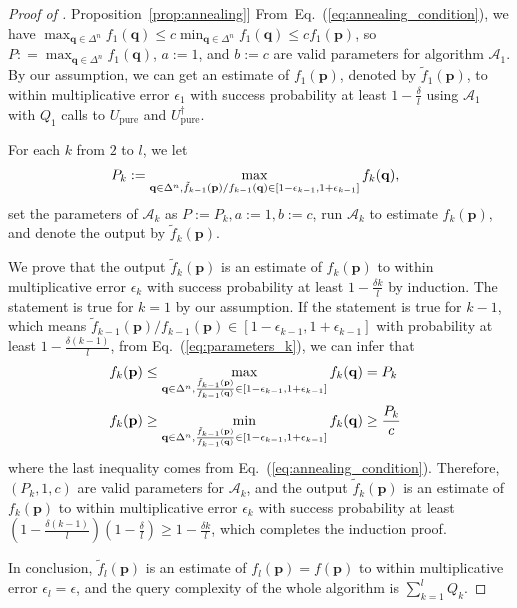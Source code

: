 \documentclass[journal]{IEEEtran}
\newcommand{\eq}[1]{Eq.~(\ref{eq:#1})}
\newcommand{\prop}[1]{\hyperref[prop:#1]{Proposition~\ref*{prop:#1}}}
\begin{document}
\begin{proof}[Proof of \prop{annealing}]
From~\eq{annealing_condition}, we have $\max_{\mathbf{q}\in \Delta^n} f_1(\mathbf{q}) \le c\min_{\mathbf{q}\in \Delta^n} f_1(\mathbf{q}) \le cf_1(\mathbf{p})$, so $P: = \max_{\mathbf{q}\in \Delta^n} f_1(\mathbf{q})$, $a := 1$, and $b := c$ are valid parameters for algorithm $\mathcal{A}_1$. By our assumption, we can get an estimate of $f_1(\mathbf{p})$, denoted by $\tilde{f}_1(\mathbf{p})$, to within multiplicative error $\epsilon_1$ with success probability at least $1-\frac{\delta}{l}$ using $\mathcal{A}_1$ with $Q_1$ calls to $U_{\mathrm{pure}}$ and $U_{\mathrm{pure}}^{\dagger}$.

For each $k$ from $2$ to $l$, we let
\begin{align}
    \label{eq:parameters_k}
\hspace{-2mm}   P_k :=\max_{\mathbf{q}\in \Delta^n,\tilde{f}_{k-1}(\mathbf{p})/f_{k-1}(\mathbf{q})\in [1-\epsilon_{k-1},1+\epsilon_{k-1}]}f_{k}(\mathbf{q}),
\end{align}
set the parameters of $\mathcal{A}_k$ as $P:=P_k, a:=1, b:=c$, run $\mathcal{A}_k$ to estimate $f_k(\mathbf{p})$, and denote the output by $\tilde{f}_{k}(\mathbf{p})$.

We prove that the output $\tilde{f}_{k}(\mathbf{p})$ is an estimate of $f_k(\mathbf{p})$ to within multiplicative error $\epsilon_k$ with success probability at least $1-\frac{\delta k}{l}$ by induction. The statement is true for $k = 1$ by our assumption. If the statement is true for $k-1$, which means $\tilde{f}_{k-1}(\mathbf{p})/f_{k-1}(\mathbf{p})\in[1-\epsilon_{k-1},1+\epsilon_{k-1}]$ with probability at least $1-\frac{\delta(k-1)}{l}$, from \eq{parameters_k}, we can infer that
\begin{align}
\hspace{-2.5mm}    f_k(\mathbf{p})&\le  \max_{\mathbf{q}\in \Delta^n,\frac{\tilde{f}_{k-1}(\mathbf{p})}{f_{k-1}(\mathbf{q})}\in [1-\epsilon_{k-1},1+\epsilon_{k-1}]}f_{k}(\mathbf{q}) = P_k \\
\hspace{-2.5mm}    f_k(\mathbf{p}) &\ge \min_{\mathbf{q}\in \Delta^n,\frac{\tilde{f}_{k-1}(\mathbf{p})}{f_{k-1}(\mathbf{q})}\in [1-\epsilon_{k-1},1+\epsilon_{k-1}]}f_{k}(\mathbf{q}) \ge \frac{P_k}{c} %
\end{align}
where the last inequality comes from \eq{annealing_condition}. Therefore, $(P_k,1,c)$ are valid parameters for $\mathcal{A}_k$, and the output $\tilde{f}_k(\mathbf{p})$ is an estimate of $f_k(\mathbf{p})$ to within multiplicative error $\epsilon_k$ with success probability at least $(1-\frac{\delta(k-1)}{l})(1-\frac{\delta}{l})\ge 1-\frac{\delta k}{l}$, which completes the induction proof.

In conclusion, $\tilde{f}_l(\mathbf{p})$ is an estimate of $f_l(\mathbf{p}) = f(\mathbf{p})$ to within multiplicative error $\epsilon_l = \epsilon$, and the query complexity of the whole algorithm is $\sum_{k=1}^l Q_k$.
\end{proof}
\end{document}
